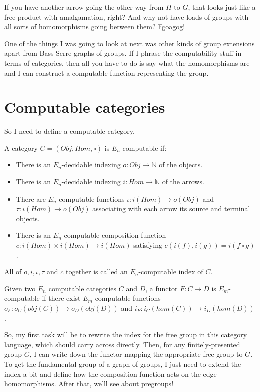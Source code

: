 \documentclass[a4paper]{article}
\theoremstyle{plain}
\theoremstyle{definition}
\begin{document}
If you have another arrow going the other way from $H$ to $G$, that looks just like a free product with amalgamation, right? And why not have loads of groups with all sorts of homomorphisms going between them? Fgoagog!

One of the things I was going to look at next was other kinds of group extensions apart from Bass-Serre graphs of groups. If I phrase the computability stuff in terms of categories, then all you have to do is say what the homomorphisms are and I can construct a computable function representing the group.

\section{Computable categories}

So I need to define a computable category.

A category $C = (Obj, Hom, \circ)$ is $E_n$-computable if:
\begin{itemize}
	\item There is an $E_n$-decidable indexing $o: Obj \rightarrow \mathbb{N}$ of the objects.
	\item There is an $E_n$-decidable indexing $i: Hom \rightarrow \mathbb{N}$ of the arrows.
	\item There are $E_n$-computable functions $\iota : i(Hom) \rightarrow o(Obj)$ and $\tau : i(Hom) \rightarrow o(Obj)$ associating with each arrow its source and terminal objects.
	\item There is an $E_n$-computable composition function $c: i(Hom) \times i(Hom) \rightarrow i(Hom)$ satisfying $c( i(f), i(g) ) = i(f \circ g)$.
\end{itemize}

All of $o, i, \iota, \tau$ and $c$ together is called an $E_n$-computable index of $C$.

Given two $E_n$ computable categories $C$ and $D$, a functor $F: C \rightarrow D$ is $E_m$-computable if there exist $E_m$-computable functions $o_F : o_C(obj(C)) \rightarrow o_D(obj(D))$ and $i_F : i_C(hom(C)) \rightarrow i_D(hom(D))$.

So, my first task will be to rewrite the index for the free group in this category language, which should carry across directly. Then, for any finitely-presented group $G$, I can write down the functor mapping the appropriate free group to $G$. To get the fundamental group of a graph of groups, I just need to extend the index a bit and define how the composition function acts on the edge homomorphisms. After that, we'll see about pregroups!
\end{document}
